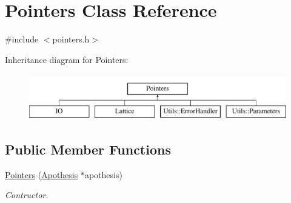 \hypertarget{classPointers}{}\section{Pointers Class Reference}
\label{classPointers}


{\ttfamily \#include $<$pointers.\+h$>$}

Inheritance diagram for Pointers\+:\begin{figure}[H]
\begin{center}
\leavevmode
\includegraphics[height=2.000000cm]{classPointers}
\end{center}
\end{figure}
\subsection*{Public Member Functions}
\begin{DoxyCompactItemize}
\item 
\mbox{\label{classPointers_affc1e7aa2bea5b24f4b03660d64897da}} 
\mbox{\hyperlink{classPointers_affc1e7aa2bea5b24f4b03660d64897da}{Pointers}} (\mbox{\hyperlink{classApothesis}{Apothesis}} $\ast$apothesis)
\begin{DoxyCompactList}\small\item\em Contructor. \end{DoxyCompactList}\end{DoxyCompactItemize}
